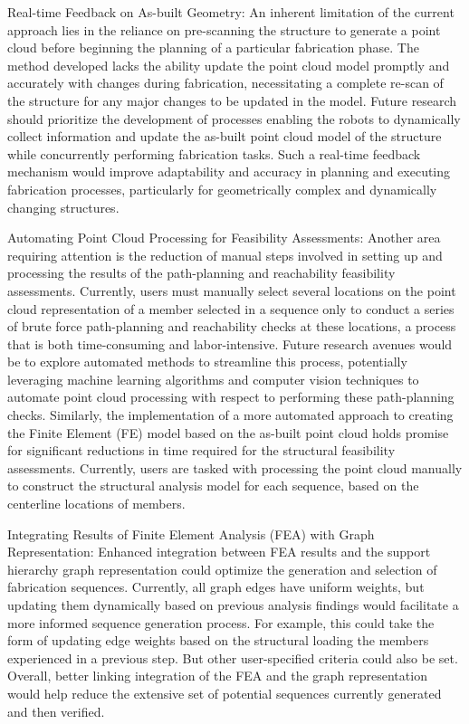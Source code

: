     Real-time Feedback on As-built Geometry: An inherent limitation of the current approach lies in the reliance on pre-scanning the structure to generate a point cloud before beginning the planning of a particular fabrication phase. The method developed lacks the ability update the point cloud model promptly and accurately with changes during fabrication, necessitating a complete re-scan of the structure for any major changes to be updated in the model. Future research should prioritize the development of processes enabling the robots to dynamically collect information and update the as-built point cloud model of the structure while concurrently performing fabrication tasks. Such a real-time feedback mechanism would improve adaptability and accuracy in planning and executing fabrication processes, particularly for geometrically complex and dynamically changing structures. 

    Automating Point Cloud Processing for Feasibility Assessments: Another area requiring attention is the reduction of manual steps involved in setting up and processing the results of the path-planning and reachability feasibility assessments. Currently, users must manually select several locations on the point cloud representation of a member selected in a sequence only to conduct a series of brute force path-planning and reachability checks at these locations, a process that is both time-consuming and labor-intensive. Future research avenues would be to explore automated methods to streamline this process, potentially leveraging machine learning algorithms and computer vision techniques to automate point cloud processing with respect to performing these path-planning checks. Similarly, the implementation of a more automated approach to creating the Finite Element (FE) model based on the as-built point cloud holds promise for significant reductions in time required for the structural feasibility assessments. Currently, users are tasked with processing the point cloud manually to construct the structural analysis model for each sequence, based on the centerline locations of members.

    \newpage
    Integrating Results of Finite Element Analysis (FEA) with Graph Representation: Enhanced integration between FEA results and the support hierarchy graph representation could optimize the generation and selection of fabrication sequences. Currently, all graph edges have uniform weights, but updating them dynamically based on previous analysis findings would facilitate a more informed sequence generation process. For example, this could take the form of updating edge weights based on the structural loading the members experienced in a previous step. But other user-specified criteria could also be set. Overall, better linking integration of the FEA and the graph representation would help reduce the extensive set of potential sequences currently generated and then verified.

